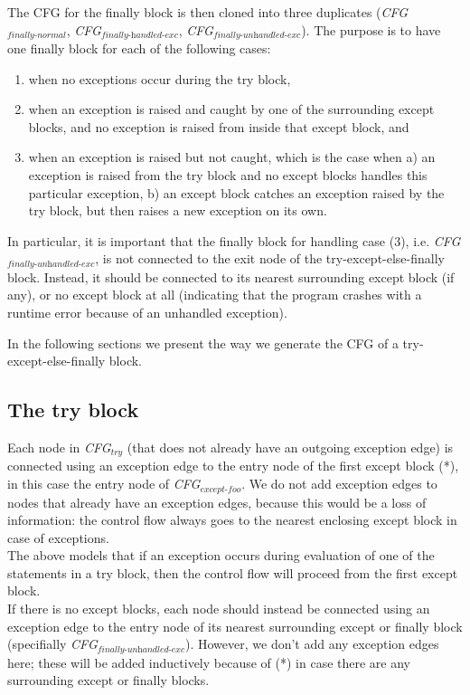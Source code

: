 The CFG for the finally block is then cloned into three duplicates (\textit{CFG$_{\textit{finally-normal}}$}, 
\textit{CFG$_{\textit{finally-handled-exc}}$}, \textit{CFG$_{\textit{finally-unhandled-exc}}$}). The purpose is to have one finally block for each of the following cases: 

\begin{enumerate}
  \item when no exceptions occur during the try block,
  \item when an exception is raised and caught by one of the surrounding except blocks, and no exception is raised from inside that except block, and
  \item when an exception is raised but not caught, which is the case when 
    a) an exception is raised from the try block and no except blocks handles this particular exception, 
    b) an except block catches an exception raised by the try block, but then raises a new exception on its own.
\end{enumerate}

\begin{sloppypar}
  In particular, it is important that the finally block for handling case (3), i.e. \textit{CFG$_{\textit{finally-unhandled-exc}}$}, 
  is not connected to the exit node of the try-except-else-finally block. Instead, it should be connected to its nearest surrounding except block (if any), 
  or no except block at all (indicating that the program crashes with a runtime error because of an unhandled exception).
\end{sloppypar}

In the following sections we present the way we generate the CFG of a try-except-else-finally block.

\subsection{The try block}
Each node in \textit{CFG$_{\textit{try}}$} (that does not already have an outgoing exception edge) is connected using an exception edge to the entry node of the first except block (*), in this case the entry node of \textit{CFG$_{\textit{except-foo}}$}. We do not add exception edges to nodes that already have an exception edges, because this would be a loss of information: the control flow always goes to the nearest enclosing except block in case of exceptions. \\
The above models that if an exception occurs during evaluation of one of the statements in a try block, then the control flow will proceed from the first except block. \\
If there is no except blocks, each node should instead be connected using an exception edge to the entry node of its nearest surrounding except or finally block (specifially \textit{CFG$_{\textit{finally-unhandled-exc}}$}). However, we don't add any exception edges here; these will be added inductively because of (*) in case there are any surrounding except or finally blocks.


